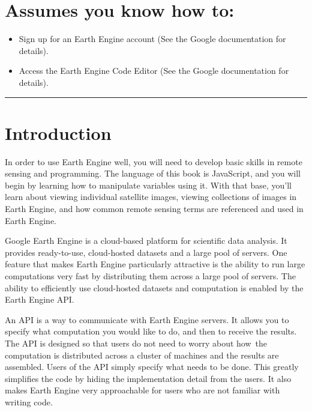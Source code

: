 \documentclass[
  letterpaper,
  DIV=11,
  numbers=noendperiod]{scrreprt}
\providecommand{\tightlist}{%
  \setlength{\itemsep}{0pt}\setlength{\parskip}{0pt}}\usepackage{longtable,booktabs,array}
\begin{document}
\hypertarget{assumes-you-know-how-to}{%
\section*{Assumes you know how to:}\label{assumes-you-know-how-to}}


\begin{itemize}
\tightlist
\item
  Sign up for an Earth Engine account (See the Google documentation for
  details).
\item
  Access the Earth Engine Code Editor (See the Google documentation for
  details).
\end{itemize}

\begin{center}\rule{0.5\linewidth}{0.5pt}\end{center}

\hypertarget{introduction-1}{%
\section*{Introduction}\label{introduction-1}}


In order to use Earth Engine well, you will need to develop basic skills
in remote sensing and programming. The language of this book is
JavaScript, and you will begin by learning how to manipulate variables
using it. With that base, you'll learn about viewing individual
satellite images, viewing collections of images in Earth Engine, and how
common remote sensing terms are referenced and used in Earth Engine.

Google Earth Engine is a cloud-based platform for scientific data
analysis. It provides ready-to-use, cloud-hosted datasets and a large
pool of servers. One feature that makes Earth Engine particularly
attractive is the ability to run large computations very fast by
distributing them across a large pool of servers. The ability to
efficiently use cloud-hosted datasets and computation is enabled by the
Earth Engine API.

An API is a way to communicate with Earth Engine servers. It allows you
to specify what computation you would like to do, and then to receive
the results. The API is designed so that users do not need to worry
about how~the computation is distributed across a cluster of machines
and the results are assembled. Users of the API simply specify what
needs to be done. This greatly simplifies the code by hiding the
implementation detail from the users. It also makes Earth Engine very
approachable for users who are not familiar with writing code.
\end{document}
